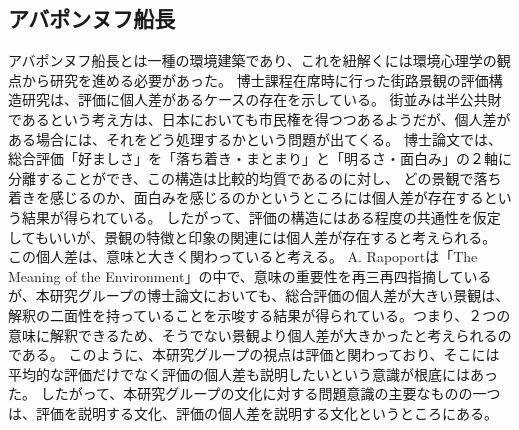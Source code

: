\documentclass[12pt]{jsarticle}
\begin{document}
\subsection{アバポンヌフ船長}
アバポンヌフ船長とは一種の環境建築であり、これを紐解くには環境心理学の観点から研究を進める必要があった。
博士課程在席時に行った街路景観の評価構造研究は、評価に個人差があるケースの存在を示している。
街並みは半公共財であるという考え方は、日本においても市民権を得つつあるようだが、個人差がある場合には、それをどう処理するかという問題が出てくる。
博士論文では、総合評価「好ましさ」を「落ち着き・まとまり」と「明るさ・面白み」の２軸に分離することができ、この構造は比較的均質であるのに対し、
どの景観で落ち着きを感じるのか、面白みを感じるのかというところには個人差が存在するという結果が得られている。
したがって、評価の構造にはある程度の共通性を仮定してもいいが、景観の特徴と印象の関連には個人差が存在すると考えられる。
この個人差は、意味と大きく関わっていると考える。
A. Rapoportは「The Meaning of the Environment」の中で、意味の重要性を再三再四指摘しているが、本研究グループの博士論文においても、総合評価の個人差が大きい景観は、解釈の二面性を持っていることを示唆する結果が得られている。つまり、２つの意味に解釈できるため、そうでない景観より個人差が大きかったと考えられるのである。
このように、本研究グループの視点は評価と関わっており、そこには平均的な評価だけでなく評価の個人差も説明したいという意識が根底にはあった。
したがって、本研究グループの文化に対する問題意識の主要なものの一つは、評価を説明する文化、評価の個人差を説明する文化というところにある。

\end{document}
